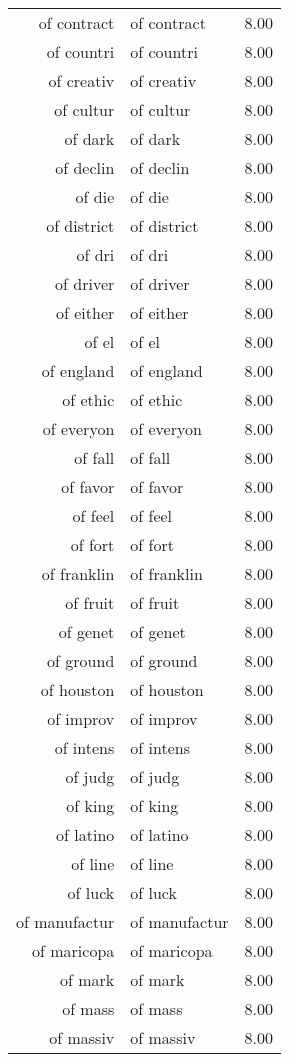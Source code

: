 \begin{table}[ht]
\begin{tabular}{rlr}
  of contract & of contract & 8.00 \\ 
  of countri & of countri & 8.00 \\ 
  of creativ & of creativ & 8.00 \\ 
  of cultur & of cultur & 8.00 \\ 
  of dark & of dark & 8.00 \\ 
  of declin & of declin & 8.00 \\ 
  of die & of die & 8.00 \\ 
  of district & of district & 8.00 \\ 
  of dri & of dri & 8.00 \\ 
  of driver & of driver & 8.00 \\ 
  of either & of either & 8.00 \\ 
  of el & of el & 8.00 \\ 
  of england & of england & 8.00 \\ 
  of ethic & of ethic & 8.00 \\ 
  of everyon & of everyon & 8.00 \\ 
  of fall & of fall & 8.00 \\ 
  of favor & of favor & 8.00 \\ 
  of feel & of feel & 8.00 \\ 
  of fort & of fort & 8.00 \\ 
  of franklin & of franklin & 8.00 \\ 
  of fruit & of fruit & 8.00 \\ 
  of genet & of genet & 8.00 \\ 
  of ground & of ground & 8.00 \\ 
  of houston & of houston & 8.00 \\ 
  of improv & of improv & 8.00 \\ 
  of intens & of intens & 8.00 \\ 
  of judg & of judg & 8.00 \\ 
  of king & of king & 8.00 \\ 
  of latino & of latino & 8.00 \\ 
  of line & of line & 8.00 \\ 
  of luck & of luck & 8.00 \\ 
  of manufactur & of manufactur & 8.00 \\ 
  of maricopa & of maricopa & 8.00 \\ 
  of mark & of mark & 8.00 \\ 
  of mass & of mass & 8.00 \\ 
  of massiv & of massiv & 8.00 \\ 

\end{tabular}
\end{table}
